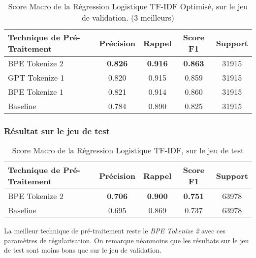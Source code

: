 \begin{table}[ht]
    \centering
    \caption{Score Macro de la Régression Logistique TF-IDF Optimisé, sur le jeu de validation. (3 meilleurs)}
    \begin{tabular}{lcccc}
    \hline
    \textbf{Technique de Pré-Traitement} & \textbf{Précision} & \textbf{Rappel} & \textbf{Score F1} & \textbf{Support} \\ \hline
    BPE Tokenize 2                          & \textbf{0.826}              & \textbf{0.916}           & \textbf{0.863}             & 31915            \\
    GPT Tokenize 1                          & 0.820              & 0.915           & 0.859             & 31915            \\
    BPE Tokenize 1                           & 0.821              & 0.914           & 0.860             & 31915            \\ \hline
    Baseline             & 0.784             & 0.890           & 0.825             & 31915            \\ \hline
\end{tabular}
\label{tab:results}
\end{table}


\subsubsection{Résultat sur le jeu de test}
\begin{table}[ht]
    \centering
    \caption{Score Macro de la Régression Logistique TF-IDF, sur le jeu de test}
    \begin{tabular}{lcccc}
    \hline
    \textbf{Technique de Pré-Traitement} & \textbf{Précision} & \textbf{Rappel} & \textbf{Score F1} & \textbf{Support} \\ \hline
    BPE Tokenize 2                          & \textbf{0.706}              & \textbf{0.900}           & \textbf{0.751}            & 63978            \\\hline
    Baseline                               & 0.695              & 0.869           & 0.737             & 63978            \\ \hline
\end{tabular}
\label{tab:results}
\end{table}
La meilleur technique de pré-traitement reste le \textit{BPE Tokenize 2} avec ces paramètres de régularisation.
On remarque néanmoins que les résultats sur le jeu de test sont moins bons que sur le jeu de validation.

